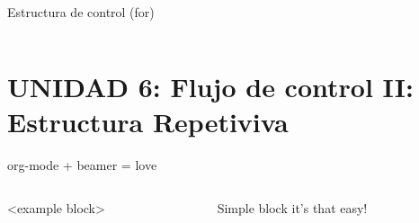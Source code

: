 \documentclass[presentation, aspectratio=54]{beamer}
\begin{document}
\begin{frame}[label={sec:org56fc702}]{Estructura de control (for)}
\begin{columns}
\begin{column}{0.6\columnwidth}
\begin{center}
\end{center}
\end{column}
\end{columns}
\end{frame}


\section{UNIDAD 6: Flujo de control II: Estructura Repetiviva}
\label{sec:org161beef}
\begin{frame}[label={sec:orgb4bf71b}]{org-mode + beamer =  love}
\begin{columns}
\begin{column}{0.7\columnwidth}
<example block>
\end{column}
\begin{column}{0.3\columnwidth}
\begin{block}{Simple block}
it's that easy!
\end{block}
\end{column}
\end{columns}
\end{frame}
\end{document}
